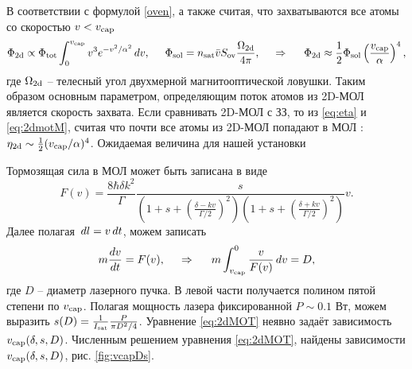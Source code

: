 




\startp
{}
В соответствии с формулой \eqref{oven}, а также считая, что захватываются все атомы со скоростью $v < v_{\textnormal{cap}}$ \cite{hf}
\begin{equation}
	\Phi_{\textnormal{2d}} \propto \Phi_{\textnormal{tot}} \int_{0}^{v_{\textnormal{cap}}} v^3 e^{-v^2/\alpha^2} \, d v,
	\hspace{5 mm} 
	\Phi_{\textnormal{sol}} = n_{\textnormal{sat}} \bar{v} S_{\textnormal{ov}} \frac{\Omega_{\textnormal{2d}}}{4 \pi},
	\hspace{0.5cm} \Rightarrow \hspace{0.5cm}
	\Phi_{\textnormal{2d}} \approx \frac{1}{2} \Phi_{\textnormal{sol}} \left(\frac{v_{\textnormal{cap}}}{\alpha}\right)^4,
	\label{eq:2dmotM}
\end{equation}
где $\Omega_{\textnormal{2d}}$ -- телесный угол двухмерной магнитооптической ловушки. Таким образом основным параметром, определяющим поток атомов из 2D-МОЛ является скорость захвата.  Если сравнивать 2D-МОЛ с ЗЗ, то из \eqref{eq:eta} и \eqref{eq:2dmotM}, считая что почти все атомы из 2D-МОЛ попадают в МОЛ \cite{ravenhall_high-flux_2021}: $\eta_{\textnormal{2d}} \sim \frac{1}{2}(v_{\textnormal{cap}} / \alpha)^4$. Ожидаемая величина для нашей установки 



Тормозящая сила в МОЛ \cite[(3.1.5)]{vlad} может быть записана в виде
\begin{equation}
	F(v) = \frac{8 \hbar \delta k^2}{\Gamma} \frac{s}{\left(1+s+\left(\frac{\delta-kv}{\Gamma/2}\right)^2\right)\left(1+s+\left(\frac{\delta+kv}{\Gamma/2}\right)^2\right)}v.
	\label{eq:force2}
\end{equation}
Далее полагая $\, d l = v \, d t$, можем записать
\begin{equation}
	m \frac{dv}{dt} = F(v),
	\hspace{0.5cm} \Rightarrow \hspace{0.5cm}
	m \int_{v_{\textnormal{cap}}}^{0} \frac{v}{F(v)} \, d v = D,
	\label{eq:2dMOT}
\end{equation}
где $D$ -- диаметр лазерного пучка. В левой части получается полином пятой степени по $v_{\textnormal{cap}}$. Полагая мощность лазера фиксированной  $P \sim 0.1$ Вт, можем выразить $s(D) = \frac{1}{I_{\textnormal{sat}}}\frac{P}{\pi D^2/4}$.  Уравнение \eqref{eq:2dMOT} неявно задаёт зависимость $v_{\textnormal{cap}}(\delta, s, D)$. Численным решением уравнения \eqref{eq:2dMOT}, найдены зависимости $v_{\textnormal{cap}}(\delta, s, D)$, рис. \ref{fig:vcapDs}.


